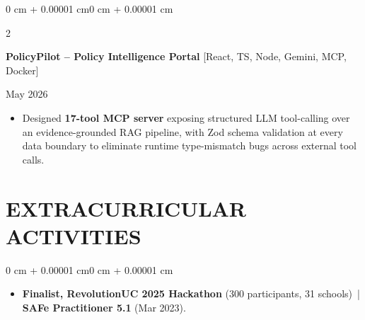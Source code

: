 \documentclass[10pt, letterpaper]{article}
\newenvironment{highlights}{
    \begin{itemize}[
        topsep=0.10 cm,
        parsep=0.06 cm,
        partopsep=0pt,
        itemsep=0.06 cm,
        leftmargin=12pt
    ]
}{
    \end{itemize}
}
\newenvironment{onecolentry}{
    \begin{adjustwidth}{0 cm + 0.00001 cm}{0 cm + 0.00001 cm}
}{
    \end{adjustwidth}
}
\newenvironment{twocolentry}[2][]{
    \onecolentry
    \def\secondColumn{#2}
    \setcolumnwidth{\fill, 4.5 cm}
    \begin{paracol}{2}
}{
    \switchcolumn \raggedleft \secondColumn
    \end{paracol}
    \endonecolentry
}
\begin{document}
\begin{twocolentry}{May 2026}
\textbf{PolicyPilot -- Policy Intelligence Portal} [React, TS, Node, Gemini, MCP, Docker]
\end{twocolentry}
\begin{highlights}
  \item Designed \textbf{17-tool MCP server} exposing structured LLM tool-calling over an evidence-grounded RAG pipeline, with Zod schema validation at every data boundary to eliminate runtime type-mismatch bugs across external tool calls.
\end{highlights}

\section{EXTRACURRICULAR ACTIVITIES}
\begin{onecolentry}
\begin{highlights}
  \item \textbf{Finalist, RevolutionUC 2025 Hackathon} (300 participants, 31 schools) \,|\, \textbf{SAFe Practitioner 5.1} (Mar 2023).
\end{highlights}
\end{onecolentry}
\end{document}

